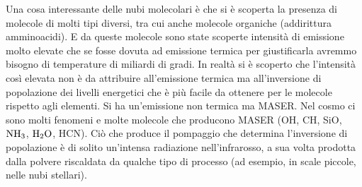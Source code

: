 Una cosa interessante delle nubi molecolari è che si è scoperta la presenza di molecole di molti tipi diversi, tra cui anche molecole organiche (addirittura amminoacidi). E da queste molecole sono state scoperte intensità di emissione molto elevate che se fosse dovuta ad emissione termica per giustificarla avremmo bisogno di temperature di miliardi di gradi. In realtà si è scoperto che l'intensità così elevata non è da attribuire all'emissione termica ma all'inversione di popolazione dei livelli energetici che è più facile da ottenere per le molecole rispetto agli elementi. Si ha un'emissione non termica ma MASER. Nel cosmo ci sono molti fenomeni e molte molecole che producono MASER (OH, CH, SiO, $\ce{NH3}$, $\ce{H2O}$, HCN). Ciò che produce il pompaggio che determina l'inversione di popolazione è di solito un'intensa radiazione nell'infrarosso, a sua volta prodotta dalla polvere riscaldata da qualche tipo di processo (ad esempio, in scale piccole, nelle nubi stellari).